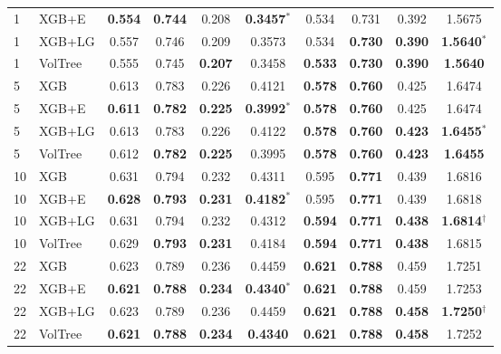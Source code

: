 \documentclass[runningheads,a4paper]{llncs}
\begin{document}
\begin{table}[t]
\begin{tabular}{ll cccc cccc}
1 & XGB+E    & \textbf{0.554} & \textbf{0.744} & 0.208 & \textbf{0.3457$^{*}$} & 0.534 & 0.731 & 0.392 & 1.5675 \\
1 & XGB+LG   & 0.557 & 0.746 & 0.209 & 0.3573 & 0.534 & \textbf{0.730} & \textbf{0.390} & \textbf{1.5640$^{*}$} \\
1 & VolTree  & 0.555 & 0.745 & \textbf{0.207} & 0.3458 & \textbf{0.533} & \textbf{0.730} & \textbf{0.390} & \textbf{1.5640} \\
\midrule
5 & XGB      & 0.613 & 0.783 & 0.226 & 0.4121 & \textbf{0.578} & \textbf{0.760} & 0.425 & 1.6474 \\
5 & XGB+E    & \textbf{0.611} & \textbf{0.782} & \textbf{0.225} & \textbf{0.3992$^{*}$} & \textbf{0.578} & \textbf{0.760} & 0.425 & 1.6474 \\
5 & XGB+LG   & 0.613 & 0.783 & 0.226 & 0.4122 & \textbf{0.578} & \textbf{0.760} & \textbf{0.423} & \textbf{1.6455$^{*}$} \\
5 & VolTree  & 0.612 & \textbf{0.782} & \textbf{0.225} & 0.3995 & \textbf{0.578} & \textbf{0.760} & \textbf{0.423} & \textbf{1.6455} \\
\midrule
10 & XGB      & 0.631 & 0.794 & 0.232 & 0.4311 & 0.595 & \textbf{0.771} & 0.439 & 1.6816 \\
10 & XGB+E    & \textbf{0.628} & \textbf{0.793} & \textbf{0.231} & \textbf{0.4182$^{*}$} & 0.595 & \textbf{0.771} & 0.439 & 1.6818 \\
10 & XGB+LG   & 0.631 & 0.794 & 0.232 & 0.4312 & \textbf{0.594} & \textbf{0.771} & \textbf{0.438} & \textbf{1.6814$^{\dagger}$} \\
10 & VolTree  & 0.629 & \textbf{0.793} & \textbf{0.231} & 0.4184 & \textbf{0.594} & \textbf{0.771} & \textbf{0.438} & 1.6815 \\
\midrule
22 & XGB      & 0.623 & 0.789 & 0.236 & 0.4459 & \textbf{0.621} & \textbf{0.788} & 0.459 & 1.7251 \\
22 & XGB+E    & \textbf{0.621} & \textbf{0.788} & \textbf{0.234} & \textbf{0.4340$^{*}$} & \textbf{0.621} & \textbf{0.788} & 0.459 & 1.7253 \\
22 & XGB+LG   & 0.623 & 0.789 & 0.236 & 0.4459 & \textbf{0.621} & \textbf{0.788} & \textbf{0.458} & \textbf{1.7250$^{\dagger}$} \\
22 & VolTree  & \textbf{0.621} & \textbf{0.788} & \textbf{0.234} & \textbf{0.4340} & \textbf{0.621} & \textbf{0.788} & \textbf{0.458} & 1.7252 \\
\bottomrule
\end{tabular}
\end{table}
\end{document}
